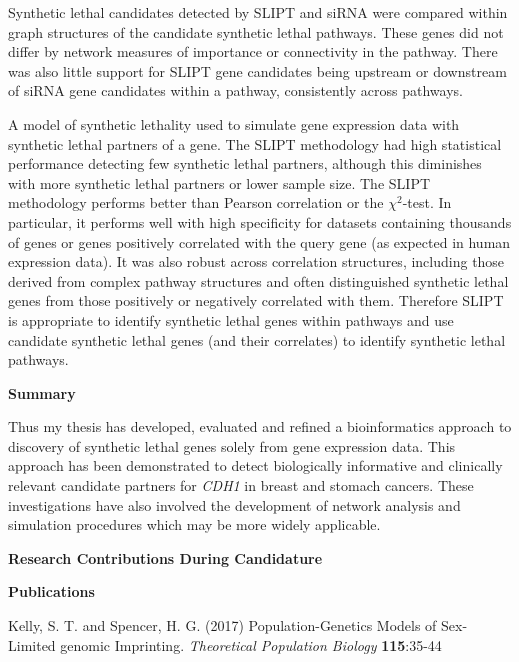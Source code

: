 Synthetic lethal candidates detected by \acrshort{SLIPT} and \acrshort{siRNA} were compared within graph structures of the candidate synthetic lethal pathways. These genes did not differ by network measures of importance or connectivity in the pathway. There was also little support for \acrshort{SLIPT} gene candidates being upstream or downstream of \acrshort{siRNA} gene candidates within a pathway, consistently across pathways. 


A model of synthetic lethality used to simulate gene expression data with synthetic lethal partners of a gene. The \acrshort{SLIPT} methodology had high statistical performance detecting few synthetic lethal partners, although this diminishes with more synthetic lethal partners or lower sample size. The \acrshort{SLIPT} methodology performs better than Pearson correlation or the $\chi^2$-test. In particular, it performs well with high specificity for datasets containing thousands of genes or genes positively correlated with the query gene (as expected in human expression data). It was also robust across correlation structures, including those derived from complex pathway structures and often distinguished synthetic lethal genes from those positively or negatively correlated with them. Therefore \acrshort{SLIPT} is appropriate to identify synthetic lethal genes within pathways and use candidate synthetic lethal genes (and their correlates) to identify synthetic lethal pathways.

\clearpage
\textbf{Summary}

Thus my thesis has developed, evaluated and refined a bioinformatics approach to discovery of synthetic lethal genes solely from gene expression data. This approach has been demonstrated to detect biologically informative and clinically relevant candidate partners for \textit{CDH1} in breast and stomach cancers. These investigations have also involved the development of network analysis and simulation procedures which may be more widely applicable.

\clearpage

\begin{center}
 \textbf{Research Contributions During Candidature}
\end{center}

\textbf{Publications}

\begin{small} \begin{flushleft} Kelly, S. T. and Spencer, H. G. (2017) Population-Genetics Models of Sex-Limited \Gls{genomic} Imprinting. \textit{Theoretical Population Biology} \textbf{115}:35-44  \end{flushleft} \end{small}

